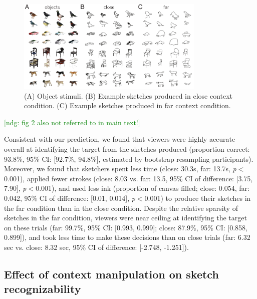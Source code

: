 \documentclass[9pt,twocolumn,twoside]{pnas-new}
\newcommand{\ndg}[1]{\textcolor{Green}{[ndg: #1]}}
\begin{document}
\begin{figure}[htbp]
\centering
\includegraphics[width=0.8\textwidth]{figures/2_sketch_gallery-min.pdf}
\caption{(A) Object stimuli. (B) Example sketches produced in close context condition. (C) Example sketches produced in far context condition.}
\label{sketch_gallery}
\end{figure}
\ndg{fig 2 also not referred to in main text!}


Consistent with our prediction, we found that viewers were highly accurate overall at identifying the target from the sketches produced (proportion correct: 93.8\%, 95\% CI: [92.7\%, 94.8\%], estimated by bootstrap resampling participants). 
Moreover, we found that sketchers spent less time (close: 30.3s, far: 13.7s, \textit{p}$<$0.001), applied fewer strokes (close: 8.03 vs. far: 13.5, 95\% CI of difference: [3.75, 7.90], \textit{p}$<$0.001), and used less ink (proportion of canvas filled; close: 0.054, far: 0.042, 95\% CI of difference: [0.01, 0.014], \textit{p}$<$0.001) to produce their sketches in the far condition than in the close condition. 
Despite the relative sparsity of sketches in the far condition, viewers were near ceiling at identifying the target on these trials (far: 99.7\%, 95\% CI: [0.993, 0.999]; close: 87.9\%, 95\% CI: [0.858, 0.899]), and took less time to make these decisions than on close trials (far: 6.32 sec vs. close: 8.32 sec, 95\% CI of difference: [-2.748, -1.251]).

\subsection*{Effect of context manipulation on sketch recognizability}
\end{document}
